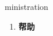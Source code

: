 
\begin{frame}
{\huge ministration}
\begin{center}
\begin{enumerate}\Large
  \item \textbf{帮助}
\end{enumerate}
\end{center}
\end{frame}
